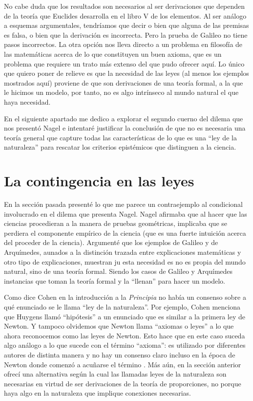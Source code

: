 No cabe duda que los resultados son necesarios al ser derivaciones que dependen de la teoría que Euclides desarrolla en el libro V de los elementos. Al ser análogo a esquemas argumentales, tendríamos que decir o bien que alguna de las premisas es falsa, o bien que la derivación es incorrecta. Pero la prueba de Galileo no tiene pasos incorrectos. La otra opción nos lleva directo a un problema en filosofía de las matemáticas acerca de lo que constituyen un buen axioma, que es un problema que requiere un trato más extenso del que pudo ofrecer aquí. Lo único que quiero poner de relieve es que la necesidad de las leyes (al menos los ejemplos mostrados aquí) proviene de que son derivaciones de una teoría formal, a la que le hicimos un modelo, por tanto, no es algo intrínseco al mundo natural el que haya necesidad.

En el siguiente apartado me dedico a explorar el segundo cuerno del dilema que nos presentó Nagel e intentaré justificar la conclusión de que no es necesaria una teoría general que capture todas las características de lo que es una ``ley de la naturaleza'' para rescatar los criterios epistémicos que distinguen a la ciencia.

\section{La contingencia en las leyes}

\noindent En la sección pasada presenté lo que me parece un contraejemplo al condicional involucrado en el dilema que presenta Nagel. Nagel afirmaba que al hacer que las ciencias procedieran a la manera de pruebas geométricas, implicaba que se perdiera el componente empírico de la ciencia (que es una fuerte intuición acerca del proceder de la ciencia). Argumenté que los ejemplos de Galileo y de Arquímedes, aunados a la distinción trazada entre explicaciones matemáticas y otro tipo de explicaciones,  muestran ju esta necesidad es no es propia del mundo natural, sino de una teoría formal. Siendo los casos de Galileo y Arquímedes instancias que toman la teoría formal y la ``llenan'' para hacer un modelo.

Como dice Cohen en la introducción a la \textit{Principia} \cite{principia} no había un consenso sobre a qué enunciado se le llama ``ley de la naturaleza''. Por ejemplo, Cohen menciona que Huygens llamó ``hipótesis'' a un enunciado que es similar a la primera ley de Newton. Y tampoco olvidemos que Newton llama ``axiomas o leyes'' a lo que ahora reconocemos como las leyes de Newton. Esto hace que en este caso suceda algo análogo a lo que sucede con el término ``axioma'': es utilizado por diferentes autores de distinta manera y no hay un consenso claro incluso en la época de Newton donde comenzó a acuñarse el término \cite{heath2015}. Más aún, en la sección anterior ofrecí una alternativa según la cual las llamadas leyes de la naturaleza son necesarias en virtud de ser derivaciones de la teoría de proporciones, no porque haya algo en la naturaleza que implique conexiones necesarias.


